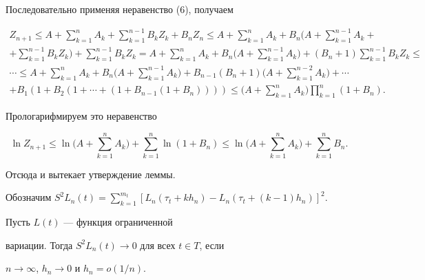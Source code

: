 \begin{pf}


Последовательно применяя неравенство (6), получаем


\begin{gather*}


Z_{n+1}\leq A+\sum_{k=1}^nA_k+\sum_{k=1}^{n-1}B_kZ_k+ B_nZ_n


\leq A+\sum_{k=1}^nA_k +B_n


\bigg(A+\sum_{k=1}^{n-1}A_k+ \\


+\sum_{k=1}^{n-1}B_kZ_k\bigg)+


\sum_{k=1}^{n-1}B_kZ_k=A+\sum_{k=1}^nA_k+ B_n


\bigg(A+\sum_{k=1}^{n-1}A_k\bigg)+


(B_n+1)\sum_{k=1}^{n-1}B_kZ_k\leq \\


\dotsb\le A+\sum_{k=1}^{n}A_k+ B_n


\bigg(A+\sum_{k=1}^{n-1}A_k\bigg)+B_{n-1}(B_n+1)


\bigg(A+\sum_{k=1}^{n-2}A_k\bigg)+\dotsb\\


+B_1(1+B_2(1+\dotsb+ (1+B_{n-1}(1+B_n))))\leq


\bigg(A+\sum_{k=1}^{n}A_k\bigg)\prod\limits_{k=1}^n(1+B_n).


\end{gather*}


Прологарифмируем это неравенство


$$


\ln Z_{n+1}\leq\ln\bigg(A+\sum_{k=1}^{n}A_k\bigg)+\sum


_{k=1}^n\ln(1+B_n)\leq \ln


\bigg(A+\sum_{k=1}^{n}A_k\bigg)+\sum_{k=1}^n B_n.


$$


Отсюда и вытекает утверждение леммы.


\end{pf}





Обозначим $S^2L_n(t)=\sum\limits_{k=1}^{m_t}[L_n(\tau_t+kh_n)-


L_n(\tau_t+(k-1)h_n)]^2$.





\begin{lem}


Пусть $L(t)$ --- функция ограниченной


вариации. Тогда  $S^2L_n(t){\to}0$ для всех $t\in T$, если


$n\to\infty$, $h_n\to 0$ и $h_n=o(1/n)$.


\end{lem}





